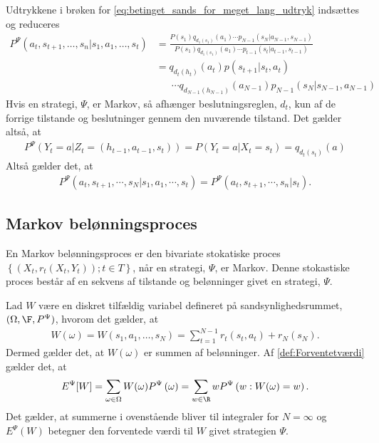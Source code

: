 Udtrykkene i brøken for \eqref{eq:betinget_sands_for_meget_lang_udtryk} indsættes og reduceres
\begin{align*}
P^\Psi(a_t , s_{t+1}, \dots, s_n | s_1 , a_1 , \dots , s_t) &=\frac{P(s_1)q_{d_1(s_1)}(a_1)
    \cdots p_{N-1}(s_N|a_{N-1} , s_{N-1})}{P(s_1)q_{d_1(s_1)}(a_1)
    \cdots p_{t-1}(s_t|a_{t-1} , s_{t-1})}\\
    &= q_{d_t(h_t)}(a_t)p(s_{t+1}|s_t , a_t)\\
    &\phantom{= \ } \cdots q_{d_{N-1}(h_{N-1})}(a_{N-1})p_{N-1}(s_N|s_{N-1} , a_{N-1})
\end{align*}
Hvis en strategi, $\Psi$, er Markov, så afhænger beslutningsreglen, $d_t$, kun af de forrige tilstande og beslutninger gennem den nuværende tilstand. Det gælder altså, at \begin{align*}
    P^\Psi \left(Y_t = a | Z_t = (h_{t-1} , a_{t-1} , s_t) \right) = P \left(Y_t = a | X_t = s_t\right) = q_{d_t(s_t)}(a)
\end{align*}
Altså gælder det, at
\begin{align*}
    P^{\Psi}\left(a_t , s_{t+1} , \cdots , s_N|s_1 , a_1 , \cdots , s_t\right)=P^{\Psi}\left(a_t , s_{t+1} , \cdots , s_n|s_t\right).
\end{align*}

\subsection{Markov belønningsproces}
En Markov belønningsproces er den bivariate stokatiske proces $\left\{\left(X_t, r_t(X_t, Y_t)\right); t \in T\right\}$, når en strategi, $\Psi$, er Markov. Denne stokastiske proces består af en sekvens af tilstande og belønninger givet en strategi, $\Psi$. 

Lad $W$ være en diskret tilfældig variabel defineret på sandsynlighedsrummet, $(\Omega, \F, P^{\Psi})$, hvorom det gælder, at
\begin{align*}
    W(\omega)=W(s_1 , a_1 , \dots , s_N) = \sum_{t=1}^{N-1} r_t(s_t,a_t) + r_N(s_N).
\end{align*}
Dermed gælder det, at $W(\omega)$ er summen af belønninger. Af \autoref{def:Forventetværdi} gælder det, at
\begin{align*}
    E^\Psi [W] = \sum_{\omega \in \Omega} W(\omega)P^\Psi\left(\omega\right) = \sum_{w \in \R} w P^\Psi \left(w: W(\omega) = w\right).
\end{align*}
 Det gælder, at summerne i ovenstående bliver til integraler for $N = \infty$ og $E^\Psi(W)$ betegner den forventede værdi til $W$ givet strategien $\Psi$.

